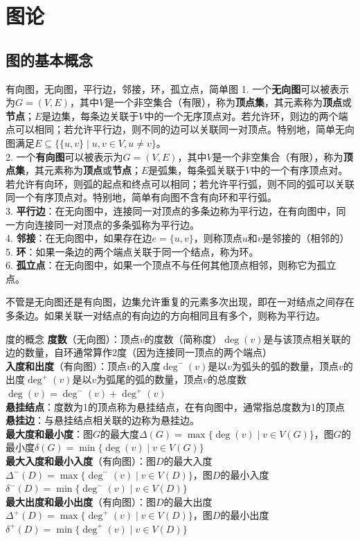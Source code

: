 \chapter{图论}
\section{图的基本概念}
\begin{definition}{有向图，无向图，平行边，邻接，环，孤立点，简单图}{}
1. 一个\textbf{无向图}可以被表示为$G = (V, E)$，其中$V$是一个非空集合（有限），称为\textbf{顶点集}，其元素称为\textbf{顶点}或\textbf{节点}；$E$是边集，每条边关联于$V$中的一个无序顶点对。若允许环，则边的两个端点可以相同；若允许平行边，则不同的边可以关联同一对顶点。特别地，简单无向图满足$E \subseteq \{\{u,v\} \mid u,v \in V, u \neq v\}$。\\
2. 一个\textbf{有向图}可以被表示为$G = (V, E)$，其中$V$是一个非空集合（有限），称为\textbf{顶点集}，其元素称为\textbf{顶点}或\textbf{节点}；$E$是弧集，每条弧关联于$V$中的一个有序顶点对。若允许有向环，则弧的起点和终点可以相同；若允许平行弧，则不同的弧可以关联同一个有序顶点对。特别地，简单有向图不含有向环和平行弧。\\
3.  \textbf{平行边}：在无向图中，连接同一对顶点的多条边称为平行边，在有向图中，同一方向连接同一对顶点的多条弧称为平行边。\\
4. \textbf{邻接}：在无向图中，如果存在边$e = \{u,v\}$，则称顶点$u$和$v$是邻接的（相邻的）\\
5. \textbf{环}：如果一条边的两个端点关联于同一个结点，称为环。\\
6. \textbf{孤立点}：在无向图中，如果一个顶点不与任何其他顶点相邻，则称它为孤立点。
\end{definition}
不管是无向图还是有向图，边集允许重复的元素多次出现，即在一对结点之间存在多条边。如果关联一对结点的有向边的方向相同且有多个，则称为平行边。
\begin{definition}{度的概念}{}
\textbf{度数}（无向图）：顶点$v$的度数（简称度）$\deg(v)$是与该顶点相关联的边的数量，自环通常算作2度（因为连接同一顶点的两个端点）\\
\textbf{入度和出度}（有向图）：顶点$v$的入度$\deg^-(v)$是以$v$为弧头的弧的数量，顶点$v$的出度$\deg^+(v)$是以$v$为弧尾的弧的数量，顶点$v$的总度数$\deg(v) = \deg^-(v) + \deg^+(v)$\\
\textbf{悬挂结点}：度数为1的顶点称为悬挂结点，在有向图中，通常指总度数为1的顶点\\
\textbf{悬挂边}：与悬挂结点相关联的边称为悬挂边。\\
\textbf{最大度和最小度}：图$G$的最大度$\Delta(G) = \max\{\deg(v) \mid v \in V(G)\}$，图$G$的最小度$\delta(G) = \min\{\deg(v) \mid v \in V(G)\}$\\
\textbf{最大入度和最小入度}（有向图）：图$D$的最大入度$\Delta^-(D) = \max\{\deg^-(v) \mid v \in V(D)\}$，图$D$的最小入度$\delta^-(D) = \min\{\deg^-(v) \mid v \in V(D)\}$\\
\textbf{最大出度和最小出度}（有向图）：图$D$的最大出度$\Delta^+(D) = \max\{\deg^+(v) \mid v \in V(D)\}$，图$D$的最小出度$\delta^+(D) = \min\{\deg^+(v) \mid v \in V(D)\}$
\end{definition}
